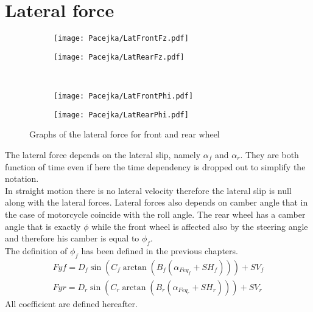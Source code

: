 \section{Lateral force}
%
\begin{figure}%
    \begin{subfigure}{.5\textwidth}
        \texttt{[image: Pacejka/LatFrontFz.pdf]}
        \caption{}
        \label{fig:lat1a}
    \end{subfigure}%
    \begin{subfigure}{.5\textwidth}
        \texttt{[image: Pacejka/LatRearFz.pdf]}
        \caption{}
        \label{fig:lat1b}
    \end{subfigure}\\
    \begin{subfigure}{.5\textwidth}
        \texttt{[image: Pacejka/LatFrontPhi.pdf]}
        \caption{}
        \label{fig:lat1c}
    \end{subfigure}%
    \begin{subfigure}{.5\textwidth}
        \texttt{[image: Pacejka/LatRearPhi.pdf]}
        \caption{}
        \label{fig:lat1d}
    \end{subfigure}
    \caption{Graphs of the lateral force for front and rear wheel}
\end{figure}
%
%
The lateral force depends on the lateral slip, namely $\alpha_f$ and $\alpha_r$. They are both function of time even if here the time dependency is dropped out to simplify the notation.\\
In straight motion there is no lateral velocity therefore the lateral slip is null along with the lateral forces. Lateral forces also depends on camber angle that in the case of motorcycle coincide with the roll angle. The rear wheel has a camber angle that is exactly $\phi$ while the front wheel is affected also by the steering angle and therefore his camber is equal to $\phi_f$.\\ 
The definition of $\phi_f$ has been defined in the previous chapters.
%
\begin{equation}
    \begin{array}{l}
        Fyf = D_f \sin(C_f \arctan(B_f ( \alpha_{Feq_f} + SH_f))) + SV_f\\
        Fyr = D_r \sin(C_r \arctan(B_r ( \alpha_{Feq_r} + SH_r))) + SV_r
    \end{array}
\end{equation}
%
All coefficient are defined hereafter.
%
